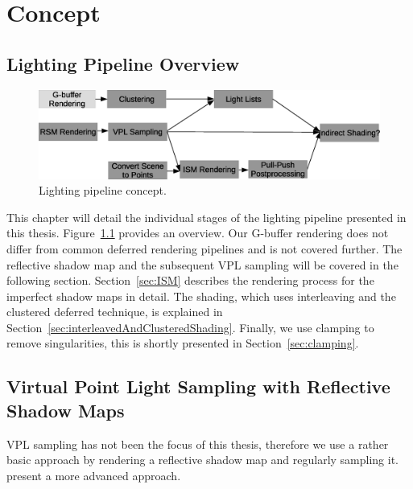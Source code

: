 
\chapter{Concept}

\section{Lighting Pipeline Overview}

\begin{figure}[h]
    \includegraphics[width=\textwidth]{graphics/Lighting_pipeline_concept_rough}
    \caption{Lighting pipeline concept.}
    \label{fig:LightingPipelineConcept}
\end{figure}


This chapter will detail the individual stages of the lighting pipeline presented in this thesis. Figure~\ref{fig:LightingPipelineConcept} provides an overview.
Our G-buffer rendering does not differ from common deferred rendering pipelines and is not covered further.
The reflective shadow map and the subsequent VPL sampling will be covered in the following section.
Section~\ref{sec:ISM} describes the rendering process for the imperfect shadow maps in detail.
The shading, which uses interleaving and the clustered deferred technique, is explained in Section~\ref{sec:interleavedAndClusteredShading}.
Finally, we use clamping to remove singularities, this is shortly presented in Section~\ref{sec:clamping}.


\section{Virtual Point Light Sampling with Reflective Shadow Maps}
\label{sec:RsmVplSampling}

VPL sampling has not been the focus of this thesis, therefore we use a rather basic approach by rendering a  reflective shadow map \parencite{Dachsbacher:2005:RSM} and regularly sampling it. \citet{hedman2016sequential} present a more advanced approach.

